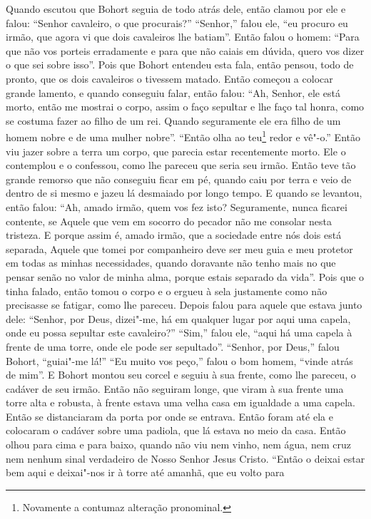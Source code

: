 Quando escutou que Bohort seguia de todo atrás dele, então clamou por ele e
falou: “Senhor cavaleiro, o que procurais?” “Senhor,” falou ele, “eu procuro
eu irmão, que agora vi que dois cavaleiros lhe batiam”. Então falou o homem:
“Para que não vos porteis erradamente e para que não caiais em dúvida, quero
vos dizer o que sei sobre isso”. Pois que Bohort entendeu esta fala, então
pensou, todo de pronto, que os dois cavaleiros o tivessem matado. Então começou
a colocar grande lamento, e quando conseguiu falar, então falou: “Ah, Senhor,
ele está morto, então me mostrai o corpo, assim o faço sepultar e lhe faço tal
honra, como se costuma fazer ao filho de um rei. Quando seguramente ele era
filho de um homem nobre e de uma mulher nobre”. “Então olha ao
teu\footnote{ Novamente a contumaz alteração pronominal.}  redor e
vê"-o.” Então viu jazer sobre a terra um corpo, que parecia estar recentemente
morto. Ele o contemplou e o confessou, como lhe pareceu que seria seu irmão.
Então teve tão grande remorso que não conseguiu ficar em pé, quando caiu por
terra e veio de dentro de si mesmo e jazeu lá desmaiado por longo tempo. E
quando se levantou, então falou: “Ah, amado irmão, quem vos fez isto?
Seguramente, nunca ficarei contente, se Aquele que vem em socorro do pecador
não me consolar nesta tristeza. E porque assim é, amado irmão, que a sociedade
entre nós dois está separada, Aquele que tomei por companheiro deve ser meu
guia e meu protetor em todas as minhas necessidades, quando doravante não tenho
mais no que pensar senão no valor de minha alma, porque estais separado da
vida”. Pois que o tinha falado, então tomou o corpo e o ergueu à sela
justamente como não precisasse se fatigar, como lhe pareceu. Depois falou para
aquele que estava junto dele: “Senhor, por Deus, dizei"-me, há em qualquer lugar
por aqui uma capela, onde eu possa sepultar este cavaleiro?” “Sim,” falou ele,
“aqui há uma capela à frente de uma torre, onde ele pode ser sepultado”.
“Senhor, por Deus,” falou Bohort, “guiai"-me lá!” “Eu muito vos peço,” falou o
bom homem, “vinde atrás de mim”. E Bohort montou seu corcel e seguiu à sua
frente, como lhe pareceu, o cadáver de seu irmão. Então não seguiram longe, que
viram à sua frente uma torre alta e robusta, à frente estava uma velha casa em
igualdade a uma capela. Então se distanciaram da porta por onde se entrava.
Então foram até ela e colocaram o cadáver sobre uma padiola, que lá estava no
meio da casa. Então olhou para cima e para baixo, quando não viu nem vinho, nem
água, nem cruz nem nenhum sinal verdadeiro de Nosso Senhor Jesus Cristo. “Então
o deixai estar bem aqui e deixai"-nos ir à torre até amanhã, que eu volto para
